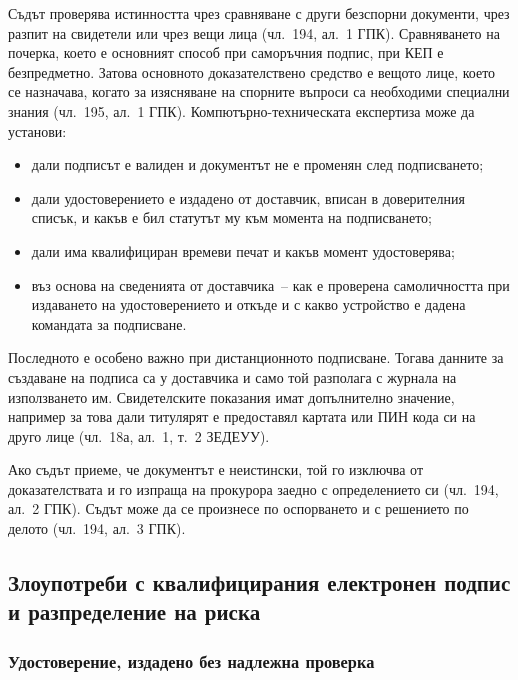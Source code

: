 Съдът проверява истинността чрез сравняване с други безспорни документи, чрез разпит на
свидетели или чрез вещи лица (чл.~194, ал.~1 ГПК). Сравняването на почерка, което е
основният способ при саморъчния подпис, при КЕП е безпредметно. Затова основното
доказателствено средство е вещото лице, което се назначава, когато за изясняване на
спорните въпроси са необходими специални знания (чл.~195, ал.~1 ГПК). Компютърно-техническата
експертиза може да установи:
\begin{itemize}
\item дали подписът е валиден и документът не е променян след подписването;
\item дали удостоверението е издадено от доставчик, вписан в доверителния списък, и какъв
  е бил статутът му към момента на подписването;
\item дали има квалифициран времеви печат и какъв момент удостоверява;
\item въз основа на сведенията от доставчика~-- как е проверена самоличността при
  издаването на удостоверението и откъде и с какво устройство е дадена командата за
  подписване.
\end{itemize}

Последното е особено важно при дистанционното подписване. Тогава данните за създаване на
подписа са у доставчика и само той разполага с журнала на използването им. Свидетелските
показания имат допълнително значение, например за това дали титулярят е предоставял
картата или ПИН кода си на друго лице (чл.~18а, ал.~1, т.~2 ЗЕДЕУУ).

Ако съдът приеме, че документът е неистински, той го изключва от доказателствата и го
изпраща на прокурора заедно с определението си (чл.~194, ал.~2 ГПК). Съдът може да се
произнесе по оспорването и с решението по делото (чл.~194, ал.~3 ГПК).

\subsection{Злоупотреби с квалифицирания електронен подпис и разпределение на риска}
\label{sec:zloupotrebi}

\subsubsection{Удостоверение, издадено без надлежна проверка}
\label{sec:proverka}

